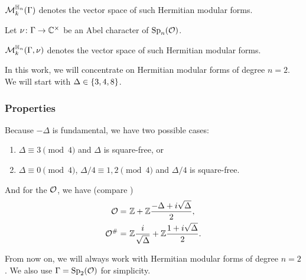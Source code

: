 $\operatorname{\mathcal{M}}^{\mathbb{H}_{n}}_k (\Gamma)$
denotes the vector space of such Hermitian modular forms.

Let $\nu \colon \Gamma \rightarrow \mathbb{C}^\times$ be an Abel character of $\operatorname{Sp}_n(\mathcal{O})$.


$\operatorname{\mathcal{M}}^{\mathbb{H}_{n}}_k (\Gamma,\nu)$
denotes the vector space of such Hermitian modular forms.

In this work, we will concentrate on Hermitian modular forms of degree $n=2$. We will start with $\Delta \in \Set{3,4,8}$.

\subsubsection{Properties}
Because $-\Delta$ is fundamental, we have two possible cases:
\begin{enumerate}
\item $\Delta \equiv 3 \pmod{4}$ and $\Delta$ is square-free, or
\item $\Delta \equiv 0 \pmod{4}$, $\Delta/4 \equiv 1,2 \pmod{4}$ and $\Delta/4$ is square-free.
\end{enumerate}
\label{maxorder}
And for the  $\mathcal{O}$, we have (compare \cite{Dern01Herm})
\begin{align*}
\mathcal{O} = &\ \mathbb{Z} +  \mathbb{Z} \frac{-\Delta+i\sqrt{\Delta}}{2} , \\
\mathcal{O}^\# = & \ \mathbb{Z} \frac{i}{\sqrt{\Delta}} + \mathbb{Z} \frac{1 + i\sqrt{\Delta}}{2} .
\end{align*}

From now on, we will always work with Hermitian modular forms of degree $n=2$. We also use $\Gamma = \operatorname{Sp}_2(\mathcal{O})$ for simplicity.

